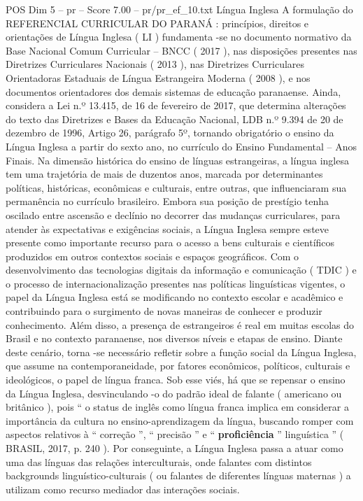 \begin{textsample}{POS Dim 5 – pr – Score 7.00 – pr/pr\_ef\_10.txt}  \label{ex:f5_pos_060}
Língua Inglesa A formulação do REFERENCIAL CURRICULAR DO PARANÁ : princípios, direitos e orientações de Língua Inglesa ( LI ) fundamenta -se no documento normativo da Base Nacional Comum Curricular – BNCC ( 2017 ), nas disposições presentes nas Diretrizes Curriculares Nacionais ( 2013 ), nas Diretrizes Curriculares Orientadoras Estaduais de Língua Estrangeira Moderna ( 2008 ), e nos documentos orientadores dos demais sistemas de educação paranaense.
Ainda, considera a Lei n.º 13.415, de 16 de fevereiro de 2017, que determina alterações do texto das Diretrizes e Bases da Educação Nacional, LDB n.º 9.394 de 20 de dezembro de 1996, Artigo 26, parágrafo 5º, tornando obrigatório o ensino da Língua Inglesa a partir do sexto ano, no currículo do Ensino Fundamental – Anos Finais.
Na dimensão histórica do ensino de línguas estrangeiras, a língua inglesa tem uma trajetória de mais de duzentos anos, marcada por determinantes políticas, históricas, econômicas e culturais, entre outras, que influenciaram sua permanência no currículo brasileiro.
Embora sua posição de prestígio tenha oscilado entre ascensão e declínio no decorrer das mudanças curriculares, para atender às expectativas e exigências sociais, a Língua Inglesa sempre esteve presente como importante recurso para o acesso a bens culturais e científicos produzidos em outros contextos sociais e espaços geográficos.
Com o desenvolvimento das tecnologias digitais da informação e comunicação ( TDIC ) e o processo de internacionalização presentes nas políticas linguísticas vigentes, o papel da Língua Inglesa está se modificando no contexto escolar e acadêmico e contribuindo para o surgimento de novas maneiras de conhecer e produzir conhecimento.
Além disso, a presença de estrangeiros é real em muitas escolas do Brasil e no contexto paranaense, nos diversos níveis e etapas de ensino.
Diante deste cenário, torna -se necessário refletir sobre a função social da Língua Inglesa, que assume na contemporaneidade, por fatores econômicos, políticos, culturais e ideológicos, o papel de língua franca.
Sob esse viés, há que se repensar o ensino da Língua Inglesa, desvinculando -o do padrão ideal de falante ( americano ou britânico ), pois “ o status de inglês como língua franca implica em considerar a importância da cultura no ensino-aprendizagem da língua, buscando romper com aspectos relativos à “ correção ”, “ precisão ” e “ \textbf{proficiência} ” linguística ” ( BRASIL, 2017, p. 240 ).
Por conseguinte, a Língua Inglesa passa a atuar como uma das línguas das relações interculturais, onde falantes com distintos backgrounds linguístico-culturais ( ou falantes de diferentes línguas maternas ) a utilizam como recurso mediador das interações sociais.

\end{textsample}
